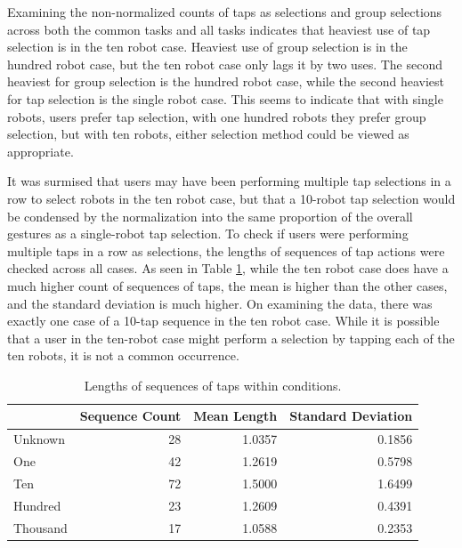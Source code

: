Examining the non-normalized counts of taps as selections and group selections across both the common tasks and all tasks indicates that heaviest use of tap selection is in the ten robot case. Heaviest use of group selection is in the hundred robot case, but the ten robot case only lags it by two uses. The second heaviest for group selection is the hundred robot case, while the second heaviest for tap selection is the single robot case. This seems to indicate that with single robots, users prefer tap selection, with one hundred robots they prefer group selection, but with ten robots, either selection method could be viewed as appropriate. 

It was surmised that users may have been performing multiple tap selections in a row to select robots in the ten robot case, but that a 10-robot tap selection would be condensed by the normalization into the same proportion of the overall gestures as a single-robot tap selection. 
To check if users were performing multiple taps in a row as selections, the lengths of sequences of tap actions were checked across all cases. 
As seen in Table \ref{tab:tap_seq_len}, while the ten robot case does have a much higher count of sequences of taps, the mean is higher than the other cases, and the standard deviation is much higher. 
On examining the data, there was exactly one case of a 10-tap sequence in the ten robot case.
While it is possible that a user in the ten-robot case might perform a selection by tapping each of the ten robots, it is not a common occurrence. 

\begin{table}
\centering
	\begin{tabular}{l | r r r}
		& Sequence Count & Mean Length & Standard Deviation \\ 
		\hline
		Unknown & 28 & 1.0357 & 0.1856 \\
		One & 42 & 1.2619 & 0.5798\\
		Ten & 72 & 1.5000 & 1.6499\\
		Hundred & 23 & 1.2609 & 0.4391\\
		Thousand & 17 & 1.0588 & 0.2353\\
	\end{tabular}
	\caption{Lengths of sequences of taps within conditions.}
	\label{tab:tap_seq_len}
\end{table}

